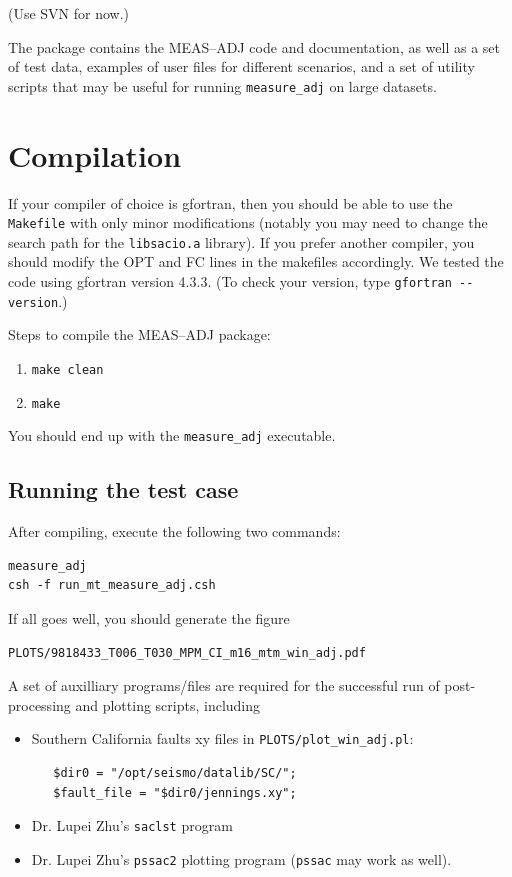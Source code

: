 \documentclass[11pt,titlepage,fleqn]{article}
\begin{document}
(Use SVN for now.)

The package contains the MEAS--ADJ code and documentation, as well as a set of test data, examples of user files for different scenarios, and a set of utility scripts that may be useful for running \verb+measure_adj+ on large datasets.


\section{Compilation}

If your compiler of choice is gfortran, then you should be able to use the \verb+Makefile+ with only minor modifications (notably you may need to change the search path for the {\tt libsacio.a} library).  If you prefer another compiler, you should modify the OPT and FC lines in the makefiles accordingly. We tested the code using gfortran version 4.3.3. (To check your version, type \verb+gfortran --version+.)

Steps to compile the MEAS--ADJ package:
%
\begin{enumerate}
\item \verb+make clean+
\item \verb+make+
\end{enumerate}

You should end up with the \verb+measure_adj+ executable.


\subsection{Running the test case}

After compiling, execute the following two commands:
%
\begin{verbatim}
measure_adj
csh -f run_mt_measure_adj.csh
\end{verbatim}
%
If all goes well, you should generate the figure
%
\begin{verbatim}
PLOTS/9818433_T006_T030_MPM_CI_m16_mtm_win_adj.pdf
\end{verbatim}

A set of auxilliary programs/files are required for the successful run of
post-processing and plotting scripts, including
\begin{itemize}
 \item Southern California faults xy files in \verb+PLOTS/plot_win_adj.pl+:
\begin{verbatim}
   $dir0 = "/opt/seismo/datalib/SC/";
   $fault_file = "$dir0/jennings.xy";
\end{verbatim}
\item Dr. Lupei Zhu's \verb+saclst+ program
\item Dr. Lupei Zhu's \verb+pssac2+ plotting program (\verb+pssac+ may work as well).
\end{itemize}
\end{document}
